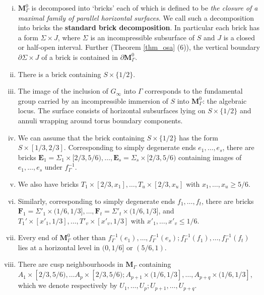 \documentclass{amsart}
\theoremstyle{definition}
\begin{document}
\begin{enumerate}[(i)]
\label{setting}
\item $\mathbf M_\Gamma^0$ is decomposed into \lq bricks' each of which is defined to be {\em the closure of a maximal family of parallel horizontal surfaces}.
We call such a decomposition into bricks the {\bf standard brick decomposition}.
In particular each brick has a form $\Sigma \times J$, where $\Sigma$ is an incompressible subsurface of $S$ and $J$ is a closed or  half-open interval. Further (Theorem \ref{thm_osa} (6)), the vertical boundary $\partial{\Sigma} \times J$ of a brick is contained in $\partial \mathbf M_\Gamma^0$. 
\item  There is a brick containing $S \times \{1/2\}$.
\item The image of the inclusion of $G_\infty$ into $\Gamma$ corresponds to the fundamental group carried by an incompressible immersion of $S$ into $\mathbf M_\Gamma^0$: the algebraic locus.
The surface consists of horizontal subsurfaces lying on $S \times \{1/2\}$ and annuli wrapping around torus boundary components.
\item We can assume that the brick containing $S\times \{1/2\}$ has the form $S\times [1/3,2/3]$.
Corresponding to simply degenerate ends $e_1, \dots, e_s$, there are bricks $\mathbf E_1=\Sigma_1 \times [2/3, 5/6), \dots , \mathbf E_s=\Sigma_s \times [2/3, 5/6)$ containing images of $e_1, \dots , e_s$ under $f_\Gamma^{-1}$.
\item We also have  bricks $T_1 \times [2/3, x_1], \dots , T_u \times [2/3, x_u]$  with $x_1, \dots , x_u \geq 5/6$.
\item Similarly, corresponding to simply degenerate ends $f_1, \dots , f_t$, there are bricks $\mathbf F_1=\Sigma'_1 \times (1/6, 1/3], \dots , \mathbf F_t=\Sigma'_t \times (1/6, 1/3]$, and $T_1' \times [x'_1, 1/3], \dots , T'_v \times [x'_v, 1/3]$ with $x'_1, \dots, x'_v \leq 1/6$.
\item Every end of $\mathbf M_\Gamma^0$ other than $f_\Gamma^{-1}(e_1), \dots , f_\Gamma^{-1}(e_s); f_\Gamma^{-1}(f_1), \dots , f_\Gamma^{-1}(f_t)$ lies at a horizontal level   in $(0, 1/6]$ or $(5/6, 1)$.
\item There are cusp neighbourhoods in $\mathbf M_\Gamma$ containing $A_1 \times [2/3, 5/6), \dots A_p \times [2/3, 5/6); A_{p+1} \times (1/6, 1/3], \dots , A_{p+q} \times (1/6, 1/3]$, which we denote respectively by $U_1, \dots, U_p; U_{p+1}, \dots , U_{p+q}$.
\end{enumerate}
\end{document}

